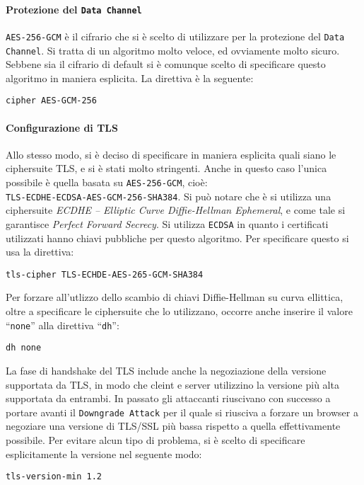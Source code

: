 \paragraph{Protezione del \texttt{Data Channel}}
\texttt{AES-256-GCM} è il cifrario che si è scelto di utilizzare per la protezione
del \texttt{Data Channel}. Si tratta di un algoritmo molto veloce, ed ovviamente
molto sicuro.
Sebbene sia il cifrario di default si è comunque scelto di specificare questo algoritmo in
maniera esplicita. La direttiva è la seguente:
\begin{verbatim}
cipher AES-GCM-256
\end{verbatim}

\paragraph{Configurazione di TLS}
Allo stesso modo, si è deciso di specificare in maniera esplicita quali siano
le ciphersuite TLS, e si è stati molto stringenti. Anche in questo caso
l'unica possibile è quella basata su \texttt{AES-256-GCM}, cioè:\\
\texttt{TLS-ECDHE-ECDSA-AES-GCM-256-SHA384}.
Si può notare che è si utilizza una ciphersuite
\textit{ECDHE -- Elliptic Curve Diffie-Hellman Ephemeral}, e come tale si garantisce
\textit{Perfect Forward Secrecy}. Si utilizza \texttt{ECDSA} in quanto i certificati
utilizzati hanno chiavi pubbliche per questo algoritmo.
Per specificare questo si usa la direttiva:
\begin{verbatim}
tls-cipher TLS-ECHDE-AES-265-GCM-SHA384
\end{verbatim}
Per forzare all'utlizzo dello scambio di chiavi Diffie-Hellman su curva ellittica, oltre
a specificare le ciphersuite che lo utilizzano, occorre anche inserire il valore
``\texttt{none}'' alla direttiva ``\texttt{dh}'':
\begin{verbatim}
dh none
\end{verbatim}

La fase di handshake del TLS include anche la negoziazione della versione supportata
da TLS, in modo che cleint e server utilizzino la versione più alta supportata da entrambi.
In passato gli attaccanti riuscivano con successo a portare avanti il \texttt{Downgrade Attack}
per il quale si riusciva a forzare un browser a negoziare una versione di TLS/SSL
più bassa rispetto a quella effettivamente possibile. Per evitare alcun tipo
di problema, si è scelto di specificare esplicitamente la versione nel seguente modo:
\begin{verbatim}
tls-version-min 1.2
\end{verbatim}

